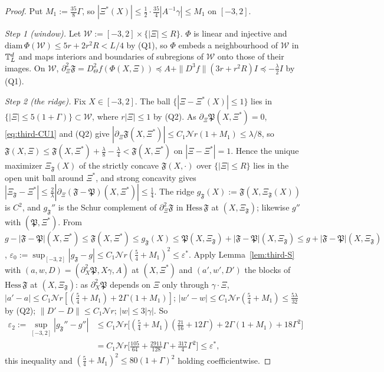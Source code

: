 \begin{proof}
Put $M_1:=\frac{35}8\Gamma$, so $|\Xi^*(X)|\le\frac12\cdot\frac{35}4|A^{-1}\gamma|\le M_1$ on $[-3,2]$.

\emph{Step 1 (window).} Let $\mathcal W:=[-3,2]\times\{|\Xi|\le R\}$. $\Phi$ is linear and injective and $\mathrm{diam}\,\Phi(\mathcal W)\le5r+2r^2R<L/4$ by (Q1), so $\Phi$ embeds a neighbourhood of $\mathcal W$ in $\mathbb T^d_L$ and maps interiors and boundaries of subregions of $\mathcal W$ onto those of their images. On $\mathcal W$, $\partial_\Xi^2\mathfrak F=D^2_\Theta f(\Phi(X,\Xi))\preceq A+\|D^3f\|(3r+r^2R)I\preceq-\frac\lambda2I$ by (Q1).

\emph{Step 2 (the ridge).} Fix $X\in[-3,2]$. The ball $\{|\Xi-\Xi^*(X)|\le1\}$ lies in $\{|\Xi|\le5(1+\Gamma)\}\subset\mathcal W$, where $r|\Xi|\le1$ by (Q2). As $\partial_\Xi\mathfrak P(X,\Xi^*)=0$, \eqref{eq:third-CU1} and (Q2) give $|\partial_\Xi\mathfrak F(X,\Xi^*)|\le C_1\mathcal Nr(1+M_1)\le\lambda/8$, so $\mathfrak F(X,\Xi)\le\mathfrak F(X,\Xi^*)+\frac\lambda8-\frac\lambda4<\mathfrak F(X,\Xi^*)$ on $|\Xi-\Xi^*|=1$. Hence the unique maximizer $\Xi_{\mathfrak F}(X)$ of the strictly concave $\mathfrak F(X,\cdot)$ over $\{|\Xi|\le R\}$ lies in the open unit ball around $\Xi^*$, and strong concavity gives $|\Xi_{\mathfrak F}-\Xi^*|\le\frac2\lambda|\partial_\Xi(\mathfrak F-\mathfrak P)(X,\Xi^*)|\le\frac14$. The ridge $g_{\mathfrak F}(X):=\mathfrak F(X,\Xi_{\mathfrak F}(X))$ is $C^2$, and $g_{\mathfrak F}''$ is the Schur complement of $\partial_\Xi^2\mathfrak F$ in $\mathrm{Hess}\,\mathfrak F$ at $(X,\Xi_{\mathfrak F})$; likewise $g''$ with $(\mathfrak P,\Xi^*)$. From $g-|\mathfrak F-\mathfrak P|(X,\Xi^*)\le\mathfrak F(X,\Xi^*)\le g_{\mathfrak F}(X)\le\mathfrak P(X,\Xi_{\mathfrak F})+|\mathfrak F-\mathfrak P|(X,\Xi_{\mathfrak F})\le g+|\mathfrak F-\mathfrak P|(X,\Xi_{\mathfrak F})$, $\varepsilon_0:=\sup_{[-3,2]}|g_{\mathfrak F}-g|\le C_1\mathcal Nr(\frac54+M_1)^2\le\varepsilon^*$. Apply Lemma~\ref{lem:third-S} with $(a,w,D)=(\partial_X^2\mathfrak P,X\gamma,A)$ at $(X,\Xi^*)$ and $(a',w',D')$ the blocks of $\mathrm{Hess}\,\mathfrak F$ at $(X,\Xi_{\mathfrak F})$: as $\partial_X^2\mathfrak P$ depends on $\Xi$ only through $\gamma\cdot\Xi$, $|a'-a|\le C_1\mathcal Nr[(\frac54+M_1)+2\Gamma(1+M_1)]$; $|w'-w|\le C_1\mathcal Nr(\frac54+M_1)\le\frac{5\lambda}{32}$ by (Q2); $\|D'-D\|\le C_1\mathcal Nr$; $|w|\le3|\gamma|$. So
\[
\begin{aligned}
\varepsilon_2:=\sup_{[-3,2]}|g_{\mathfrak F}''-g''|&\le C_1\mathcal Nr\bigl[(\tfrac54+M_1)(\tfrac{21}{16}+12\Gamma)+2\Gamma(1+M_1)+18\Gamma^2\bigr]\\
&=C_1\mathcal Nr\bigl[\tfrac{105}{64}+\tfrac{2911}{128}\Gamma+\tfrac{317}4\Gamma^2\bigr]\le\varepsilon^*,
\end{aligned}
\]
this inequality and $(\frac54+M_1)^2\le80(1+\Gamma)^2$ holding coefficientwise.


\end{proof}
